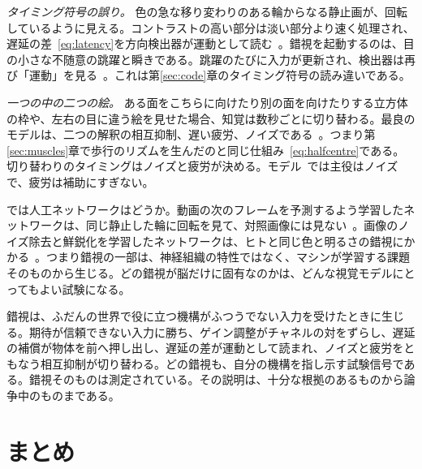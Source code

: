 \emph{タイミング符号の誤り。} 色の急な移り変わりのある輪からなる静止画が、回転しているように見える。コントラストの高い部分は淡い部分より速く処理され、遅延の差~\eqref{eq:latency}を方向検出器が運動として読む~\cite{Conway2005}。錯視を起動するのは、目の小さな不随意の跳躍と瞬きである。跳躍のたびに入力が更新され、検出器は再び「運動」を見る~\cite{OteroMillan2012}。これは第\ref{sec:code}章のタイミング符号の読み違いである。

\emph{一つの中の二つの絵。} ある面をこちらに向けたり別の面を向けたりする立方体の枠や、左右の目に違う絵を見せた場合、知覚は数秒ごとに切り替わる。最良のモデルは、二つの解釈の相互抑制、遅い疲労、ノイズである~\cite{MorenoBote2007}。つまり第\ref{sec:muscles}章で歩行のリズムを生んだのと同じ仕組み~\eqref{eq:halfcentre}である。切り替わりのタイミングはノイズと疲労が決める。モデル~\cite{MorenoBote2007}では主役はノイズで、疲労は補助にすぎない。

では人工ネットワークはどうか。動画の次のフレームを予測するよう学習したネットワークは、同じ静止した輪に回転を見て、対照画像には見ない~\cite{Watanabe2018}。画像のノイズ除去と鮮鋭化を学習したネットワークは、ヒトと同じ色と明るさの錯視にかかる~\cite{GomezVilla2020}。つまり錯視の一部は、神経組織の特性ではなく、マシンが学習する課題そのものから生じる。どの錯視が脳だけに固有なのかは、どんな視覚モデルにとってもよい試験になる。

\begin{keyblock}
\begin{proposition}[機構の痕跡としての錯視]
\label{prop:illusions}
錯視は、ふだんの世界で役に立つ機構がふつうでない入力を受けたときに生じる。期待が信頼できない入力に勝ち、ゲイン調整がチャネルの対をずらし、遅延の補償が物体を前へ押し出し、遅延の差が運動として読まれ、ノイズと疲労をともなう相互抑制が切り替わる。どの錯視も、自分の機構を指し示す試験信号である。錯視そのものは測定されている。その説明は、十分な根拠のあるものから論争中のものまである。
\end{proposition}
\end{keyblock}

\section{まとめ}

